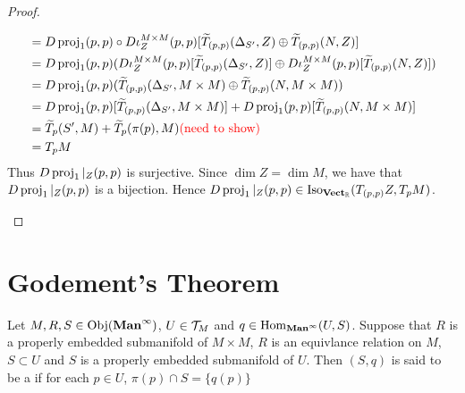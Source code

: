 \documentclass{book}
\begin{document}
\begin{proof}
\begin{enumerate}
\begin{align*}
				& = D \operatorname{\text{proj}}_1(p,p) \circ D \iota_Z^{M \times M}(p,p) [\widetilde{T}_{(p,p)} (\Delta_{S'}, Z) \oplus \widetilde{T}_{(p,p)} (N, Z)] \\
				& = D \operatorname{\text{proj}}_1(p,p) (D \iota_Z^{M \times M}(p,p) [\widetilde{T}_{(p,p)} (\Delta_{S'}, Z)] \oplus D \iota_Z^{M \times M}(p,p) [\widetilde{T}_{(p,p)} (N, Z)]) \\
				& = D \operatorname{\text{proj}}_1(p,p) (\widetilde{T}_{(p,p)} (\Delta_{S'}, M \times M) \oplus \widetilde{T}_{(p,p)} (N, M \times M)) \\
				& = D \operatorname{\text{proj}}_1(p,p) [\widetilde{T}_{(p,p)} (\Delta_{S'}, M \times M)] + D \operatorname{\text{proj}}_1(p,p) [\widetilde{T}_{(p,p)} (N, M \times M)] \\
				& = \widetilde{T}_p (S', M) + \widetilde{T}_p (\pi(p), M) \textcolor{red}{\text{(need to show)}} \\
				& = T_p M
			\end{align*}
			Thus $D \operatorname{\text{proj}}_1|_Z(p,p)$ is surjective. Since $\dim Z = \dim M$, we have that $D \operatorname{\text{proj}}_1|_Z(p,p)$ is a bijection. Hence $D \operatorname{\text{proj}}_1|_Z(p,p) \in \operatorname{Iso}_{\operatorname*{\text{\textbf{Vect}}_{\mathbb{R}}}}(T_{(p,p)} Z, T_p M)$.
		\end{enumerate}
	\end{proof}






































	
	
	
	
	
	
	
	
	
	
	\newpage
	\section{Godement's Theorem}


\begin{defn} 
	Let $M, R, S \in \operatorname{Obj}(\operatorname*{\text{\textbf{Man}}^{\infty}})$, $U \in \mathcal{T}_M$ and $q \in \operatorname{Hom}_{\operatorname*{\text{\textbf{Man}}^{\infty}}}(U, S)$. Suppose that $R$ is a properly embedded submanifold of $M \times M$, $R$ is an equivlance relation on $M$, $S \subset U$ and $S$ is a properly embedded submanifold of $U$. Then $(S, q)$ is said to be a  if for each $p \in U$, $\pi(p) \cap S = \{q(p)\}$
\end{defn}
\end{document}
